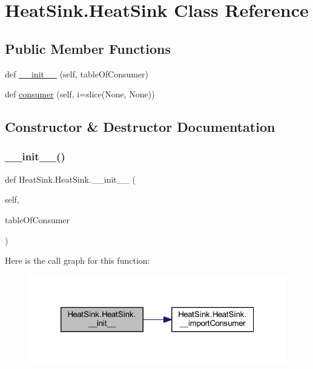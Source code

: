 \hypertarget{class_heat_sink_1_1_heat_sink}{}\section{Heat\+Sink.\+Heat\+Sink Class Reference}
\label{class_heat_sink_1_1_heat_sink}
\subsection*{Public Member Functions}
\begin{DoxyCompactItemize}
\item 
def \hyperlink{class_heat_sink_1_1_heat_sink_a1bd8a32977fa197c106013805bdedad7}{\+\_\+\+\_\+init\+\_\+\+\_\+} (self, table\+Of\+Consumer)
\item 
def \hyperlink{class_heat_sink_1_1_heat_sink_a10c8205c614c016c724f51c350b6ec18}{consumer} (self, i=slice(None, None))
\end{DoxyCompactItemize}


\subsection{Constructor \& Destructor Documentation}
\mbox{\label{class_heat_sink_1_1_heat_sink_a1bd8a32977fa197c106013805bdedad7}} 
\subsubsection{\texorpdfstring{\+\_\+\+\_\+init\+\_\+\+\_\+()}{\_\_init\_\_()}}
{\footnotesize\ttfamily def Heat\+Sink.\+Heat\+Sink.\+\_\+\+\_\+init\+\_\+\+\_\+ (\begin{DoxyParamCaption}\item[{}]{self,  }\item[{}]{table\+Of\+Consumer }\end{DoxyParamCaption})}

Here is the call graph for this function\+:
\nopagebreak
\begin{figure}[H]
\begin{center}
\leavevmode
\includegraphics[width=320pt]{class_heat_sink_1_1_heat_sink_a1bd8a32977fa197c106013805bdedad7_cgraph}
\end{center}
\end{figure}


